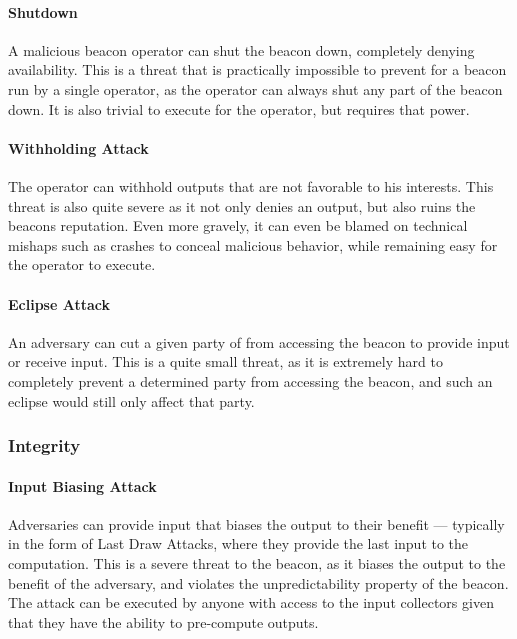 \paragraph{Shutdown} A malicious beacon operator can shut the beacon down, completely denying availability. This is a threat that is practically impossible to prevent for a beacon run by a single operator, as the operator can always shut any part of the beacon down. It is also trivial to execute for the operator, but requires that power.
\paragraph{Withholding Attack} The operator can withhold outputs that are not favorable to his interests. This threat is also quite severe as it not only denies an output, but also ruins the beacons reputation. Even more gravely, it can even be blamed on technical mishaps such as crashes to conceal malicious behavior, while remaining easy for the operator to execute.
\paragraph{Eclipse Attack} An adversary can cut a given party of from accessing the beacon to provide input or receive input. This is a quite small threat, as it is extremely hard to completely prevent a determined party from accessing the beacon, and such an eclipse would still only affect that party.


\subsubsection{Integrity}

\paragraph{Input Biasing Attack} Adversaries can provide input that biases the output to their benefit --- typically in the form of Last Draw Attacks, where they provide the last input to the computation. This is a severe threat to the beacon, as it biases the output to the benefit of the adversary, and violates the unpredictability property of the beacon. The attack can be executed by anyone with access to the input collectors given that they have the ability to pre-compute outputs.
